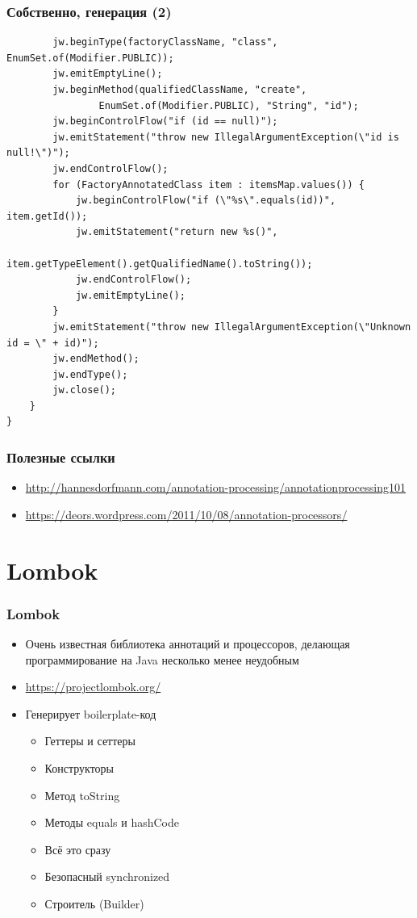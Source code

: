 \documentclass[xetex,mathserif,serif]{beamer}
\begin{document}
	\begin{frame}[fragile]
		\frametitle{Собственно, генерация (2)}
		\begin{footnotesize}
			\begin{verbatim}
        jw.beginType(factoryClassName, "class", EnumSet.of(Modifier.PUBLIC));
        jw.emitEmptyLine();
        jw.beginMethod(qualifiedClassName, "create", 
                EnumSet.of(Modifier.PUBLIC), "String", "id");
        jw.beginControlFlow("if (id == null)");
        jw.emitStatement("throw new IllegalArgumentException(\"id is null!\")");
        jw.endControlFlow();
        for (FactoryAnnotatedClass item : itemsMap.values()) {
            jw.beginControlFlow("if (\"%s\".equals(id))", item.getId());
            jw.emitStatement("return new %s()", 
                    item.getTypeElement().getQualifiedName().toString());
            jw.endControlFlow();
            jw.emitEmptyLine();
        }
        jw.emitStatement("throw new IllegalArgumentException(\"Unknown id = \" + id)");
        jw.endMethod();
        jw.endType();
        jw.close();
    }
}
			\end{verbatim}
		\end{footnotesize}
	\end{frame}

	\begin{frame}
		\frametitle{Полезные ссылки}
		\begin{itemize}
			\item \url{http://hannesdorfmann.com/annotation-processing/annotationprocessing101}
			\item \url{https://deors.wordpress.com/2011/10/08/annotation-processors/}
		\end{itemize}
	\end{frame}

	\section{Lombok}

	\begin{frame}
		\frametitle{Lombok}
		\begin{itemize}
			\item Очень известная библиотека аннотаций и процессоров, делающая программирование на Java несколько менее неудобным
			\item \url{https://projectlombok.org/}
			\item Генерирует boilerplate-код
			\begin{itemize}
				\item Геттеры и сеттеры
				\item Конструкторы
				\item Метод toString
				\item Методы equals и hashCode
				\item Всё это сразу
				\item Безопасный synchronized
				\item Строитель (Builder)
			\end{itemize}
		\end{itemize}
	\end{frame}
\end{document}
